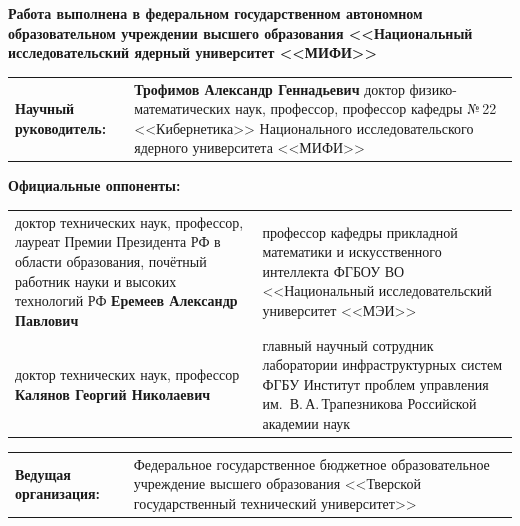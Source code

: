 \documentclass[12pt,a5paper]{article}
\begin{document}
{\scriptsize
\begin{center}
\textbf{Работа выполнена в федеральном государственном автономном
образовательном учреждении высшего образования
<<Национальный исследовательский ядерный университет <<МИФИ>>}
\end{center}

\vspace{0.15cm}

\noindent\begin{tabular}{@{}p{2.8cm}p{7.4cm}@{}}
\textbf{Научный руководитель:} & \textbf{Трофимов Александр Геннадьевич} \newline
доктор физико-математических наук, профессор, профессор кафедры №\,22 <<Кибернетика>> Национального исследовательского ядерного университета <<МИФИ>> \\
\end{tabular}

\vspace{0.15cm}

\noindent\textbf{Официальные оппоненты:}
\vspace{0.03cm}

\noindent\begin{tabular}{@{}p{2.8cm}p{7.4cm}@{}}
доктор технических наук, профессор, лауреат Премии Президента РФ в области образования, почётный работник науки и высоких технологий РФ
\newline \textbf{Еремеев Александр Павлович} &
профессор кафедры прикладной математики и искусственного интеллекта ФГБОУ ВО <<Национальный исследовательский университет <<МЭИ>> \\[0.1cm]

доктор технических наук, профессор
\newline \textbf{Калянов Георгий Николаевич} &
главный научный сотрудник лаборатории инфраструктурных систем ФГБУ Институт проблем управления им.~В.\,А.\,Трапезникова Российской академии наук \\
\end{tabular}

\vspace{0.15cm}

\noindent\begin{tabular}{@{}p{2.8cm}p{7.4cm}@{}}
\textbf{Ведущая организация:} & Федеральное государственное бюджетное образовательное учреждение высшего образования <<Тверской государственный технический университет>> \\
\end{tabular}

}
\end{document}
